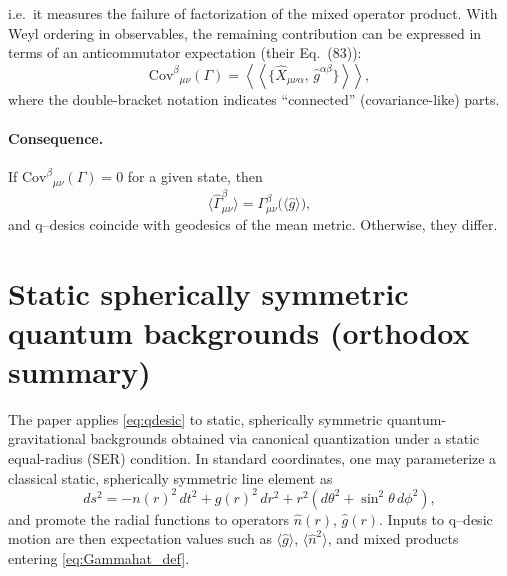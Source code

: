 \documentclass[11pt,a4paper]{article}
\theoremstyle{thmstyleone}
\theoremstyle{thmstyletwo}
\theoremstyle{thmstylethree}
\begin{document}
        i.e.\ it measures the failure of factorization of the mixed operator product.
        With Weyl ordering in observables, the remaining contribution can be expressed in terms of an anticommutator expectation
        (their Eq.\ (83)):
        \begin{equation}
            \mathrm{Cov}^{\beta}{}_{\mu\nu}(\Gamma)
            =\left\langle\!\left\langle \big\{\hat X_{\mu\nu\alpha},\,\hat g^{\alpha\beta}\big\}\right\rangle\!\right\rangle,
            \label{eq:Cov_anticom}
        \end{equation}
        where the double-bracket notation indicates ``connected'' (covariance-like) parts.

        \paragraph{Consequence.}
            If $\mathrm{Cov}^{\beta}{}_{\mu\nu}(\Gamma)=0$ for a given state, then
            \begin{equation}
                \big\langle \hat\Gamma^\beta_{\mu\nu}\big\rangle
                =
                \Gamma^\beta_{\mu\nu}\!\big(\langle \hat g\rangle\big),
            \end{equation}
            and q--desics coincide with geodesics of the mean metric. Otherwise, they differ.

        \section{Static spherically symmetric quantum backgrounds (orthodox summary)}
        The paper applies \eqref{eq:qdesic} to static, spherically symmetric quantum-gravitational backgrounds obtained via canonical quantization
        under a static equal-radius (SER) condition. In standard coordinates, one may parameterize a classical static, spherically symmetric line element as
        \begin{equation}
            ds^2 = -n(r)^2\,dt^2 + g(r)^2\,dr^2 + r^2(d\theta^2+\sin^2\theta\,d\phi^2),
            \label{eq:SSS_metric}
        \end{equation}
        and promote the radial functions to operators $\hat n(r)$, $\hat g(r)$.
        Inputs to q--desic motion are then expectation values such as $\langle \hat g\rangle$, $\langle \hat n^2\rangle$,
        and mixed products entering \eqref{eq:Gammahat_def}.
\end{document}
